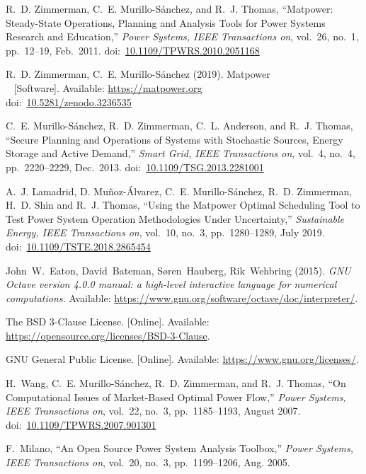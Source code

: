 \documentclass[12pt]{article}
\newcommand{\matpower}[0]{{\sc Matpower}}
\newcommand{\doi}[1]{doi:~\href{https://doi.org/#1}{#1}}
\numberwithin{equation}{section}
\numberwithin{table}{section}
\numberwithin{figure}{section}
\begin{document}
\clearpage
\begin{thebibliography}{99}

R.~D. Zimmerman, C.~E. Murillo-S{\'a}nchez, and R.~J. Thomas, ``\matpower{}: Steady-State Operations, Planning and Analysis Tools for Power Systems Research and Education,'' \emph{Power Systems, IEEE Transactions on}, vol.~26, no.~1, pp.~12--19, Feb.~2011.
\doi{10.1109/TPWRS.2010.2051168}

R.~D. Zimmerman, C.~E. Murillo-S{\'a}nchez (2019). \matpower{}\\~
[Software]. Available: \url{https://matpower.org}\\
\doi{10.5281/zenodo.3236535}

C.~E. Murillo-S{\'a}nchez, R.~D. Zimmerman, C.~L. Anderson, and R.~J. Thomas, ``Secure Planning and Operations of Systems with Stochastic Sources, Energy Storage and Active Demand,'' \emph{Smart Grid, IEEE Transactions on}, vol.~4, no.~4, pp.~2220--2229, Dec.~2013.
\doi{10.1109/TSG.2013.2281001}

A.~J. Lamadrid, D. Mu{\~n}oz-{\'A}lvarez, C.~E. Murillo-S{\'a}nchez, R.~D. Zimmerman, H.~D. Shin and R.~J. Thomas, ``Using the \matpower{} Optimal Scheduling Tool to Test Power System Operation Methodologies Under Uncertainty,'' \emph{Sustainable Energy, IEEE Transactions on}, vol.~10, no.~3, pp.~1280--1289, July 2019.
\doi{10.1109/TSTE.2018.2865454}

John~W.~Eaton, David~Bateman, S{\o}ren~Hauberg, Rik~Wehbring (2015). \emph{GNU Octave version 4.0.0 manual: a high-level interactive language for numerical computations.} Available: \url{https://www.gnu.org/software/octave/doc/interpreter/}.

The BSD 3-Clause License. [Online]. Available: \url{https://opensource.org/licenses/BSD-3-Clause}.

GNU General Public License. [Online]. Available: \url{https://www.gnu.org/licenses/}.

H.~Wang, C.~E. Murillo-S{\'a}nchez, R.~D. Zimmerman, and R.~J. Thomas, ``On
Computational Issues of Market-Based Optimal Power Flow,'' \emph{Power
Systems, IEEE Transactions on}, vol.~22, no.~3, pp.~1185--1193, August 2007.
\doi{10.1109/TPWRS.2007.901301}

F.~Milano, ``An Open Source Power System Analysis Toolbox,'' \emph{Power
  Systems, IEEE Transactions on}, vol.~20, no.~3, pp.~1199--1206, Aug. 2005.


\end{thebibliography}
\end{document}
